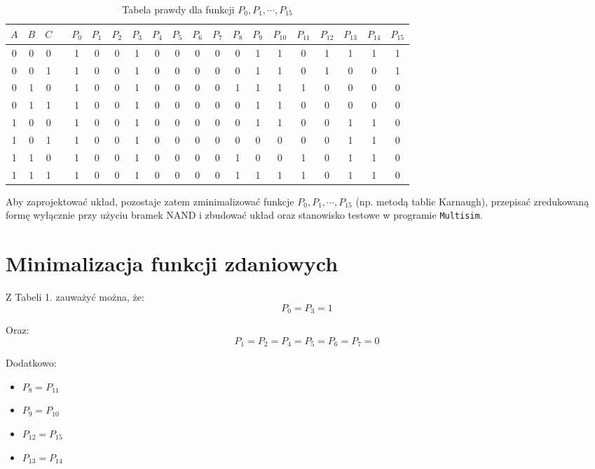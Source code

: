 \documentclass[11pt]{article}
\begin{document}
\begin{table}[H]
\caption{Tabela prawdy dla funkcji \(P_0, P_1, \cdots, P_{15}\)}
\centering
\begin{tabular}{|c|c|c|c|c|c|c|c|c|c|c|c|c|c|c|c|c|c|c|c|}
\hline
\(A\) & \(B\) & \(C\) &  & \(P_0\) & \(P_1\) & \(P_2\) & \(P_3\) & \(P_4\) & \(P_5\) & \(P_6\) & \(P_7\) & \(P_8\) & \(P_9_{}\) & \(P_{10}\) & \(P_{11}\) & \(P_{12}\) & \(P_{13}\) & \(P_{14}\) & \(P_{15}\)\\
\hline
0 & 0 & 0 &  & 1 & 0 & 0 & 1 & 0 & 0 & 0 & 0 & 0 & 1 & 1 & 0 & 1 & 1 & 1 & 1\\
0 & 0 & 1 &  & 1 & 0 & 0 & 1 & 0 & 0 & 0 & 0 & 0 & 1 & 1 & 0 & 1 & 0 & 0 & 1\\
0 & 1 & 0 &  & 1 & 0 & 0 & 1 & 0 & 0 & 0 & 0 & 1 & 1 & 1 & 1 & 0 & 0 & 0 & 0\\
0 & 1 & 1 &  & 1 & 0 & 0 & 1 & 0 & 0 & 0 & 0 & 0 & 1 & 1 & 0 & 0 & 0 & 0 & 0\\
1 & 0 & 0 &  & 1 & 0 & 0 & 1 & 0 & 0 & 0 & 0 & 0 & 1 & 1 & 0 & 0 & 1 & 1 & 0\\
1 & 0 & 1 &  & 1 & 0 & 0 & 1 & 0 & 0 & 0 & 0 & 0 & 0 & 0 & 0 & 0 & 1 & 1 & 0\\
1 & 1 & 0 &  & 1 & 0 & 0 & 1 & 0 & 0 & 0 & 0 & 1 & 0 & 0 & 1 & 0 & 1 & 1 & 0\\
1 & 1 & 1 &  & 1 & 0 & 0 & 1 & 0 & 0 & 0 & 0 & 1 & 1 & 1 & 1 & 0 & 1 & 1 & 0\\
\hline
\end{tabular}
\end{table}

Aby zaprojektować układ, pozostaje zatem zminimalizować funkcje \(P_0, P_1, \cdots, P_{15}\) (np. metodą tablic Karnaugh), przepisać zredukowaną formę wyłącznie przy użyciu
bramek NAND i zbudować układ oraz stanowisko testowe w programie \texttt{Multisim}.
\section{Minimalizacja funkcji zdaniowych}
\label{sec:org7b31ea2}

Z Tabeli 1. zauważyć można, że:
\begin{equation}
P_0 = P_3 = 1
\end{equation}

Oraz:
\begin{equation}
P_1 = P_2 = P_4 = P_5 = P_6 = P_7 = 0
\end{equation}

Dodatkowo:
\begin{itemize}
\item \(P_8 = P_{11}\)
\item \(P_9 = P_{10}\)
\item \(P_{12} = P_{15}\)
\item \(P_{13} = P_{14}\)
\end{itemize}
\end{document}
